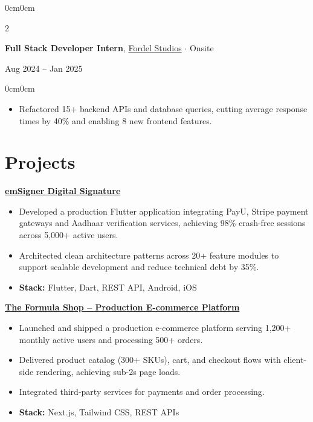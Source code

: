 \documentclass[10pt, letterpaper]{article}
\newenvironment{highlights}{
    \begin{itemize}[
        topsep=1pt,
        itemsep=0.5pt,
        parsep=0pt,
        partopsep=0pt,
        leftmargin=11pt
    ]
}{
    \end{itemize}
}
\newenvironment{onecolentry}{
    \begin{adjustwidth}{0cm}{0cm}
}{
    \end{adjustwidth}
}
\newenvironment{twocolentry}[2]{
    \onecolentry
    \setcolumnwidth{\fill,4.1cm}
    \begin{paracol}{2}
    #1
    \switchcolumn
    \raggedleft #2
}{
    \end{paracol}
    \endonecolentry
}
\begin{document}
\begin{twocolentry}{
\textbf{Full Stack Developer Intern}, \href{https://fordelstudios.com}{Fordel Studios} $\cdot$ Onsite
}{
Aug 2024 -- Jan 2025
}
\end{twocolentry}

\begin{onecolentry}
\begin{highlights}
\item Refactored 15+ backend APIs and database queries, cutting average response times by 40\% and enabling 8 new frontend features.
\end{highlights}
\end{onecolentry}

\section{Projects}

\href{https://play.google.com/store/apps/details?id=com.emudhra.emSigner&hl=en_IN}{\textbf{emSigner Digital Signature}} \\
\begin{highlights}
\item Developed a production Flutter application integrating PayU, Stripe payment gateways and Aadhaar verification services, achieving 98\% crash-free sessions across 5,000+ active users.
\item Architected clean architecture patterns across 20+ feature modules to support scalable development and reduce technical debt by 35\%.
\item \textbf{Stack:} Flutter, Dart, REST API, Android, iOS
\end{highlights}

\href{https://theformulashop.com/}{\textbf{The Formula Shop -- Production E-commerce Platform}} \\
\begin{highlights}
\item Launched and shipped a production e-commerce platform serving 1,200+ monthly active users and processing 500+ orders.
\item Delivered product catalog (300+ SKUs), cart, and checkout flows with client-side rendering, achieving sub-2s page loads.
\item Integrated third-party services for payments and order processing.
\item \textbf{Stack:} Next.js, Tailwind CSS, REST APIs
\end{highlights}
\end{document}
